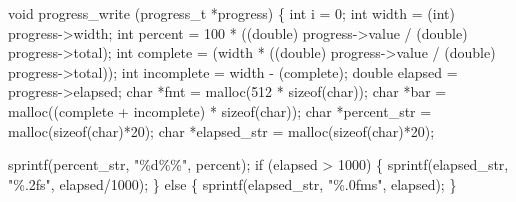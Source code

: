 \documentclass[
  a4paper,
]{scrreprt}
\newenvironment{Shaded}{\begin{snugshade}}{\end{snugshade}}
\newcommand{\ControlFlowTok}[1]{\textcolor[rgb]{0.85,0.12,0.09}{#1}}
\newcommand{\DataTypeTok}[1]{\textcolor[rgb]{0.47,0.16,0.63}{#1}}
\newcommand{\DecValTok}[1]{\textcolor[rgb]{0.47,0.16,0.63}{#1}}
\newcommand{\KeywordTok}[1]{\textcolor[rgb]{0.85,0.12,0.09}{#1}}
\newcommand{\NormalTok}[1]{\textcolor[rgb]{0.33,0.33,0.33}{#1}}
\newcommand{\OperatorTok}[1]{\textcolor[rgb]{0.00,0.46,0.62}{#1}}
\newcommand{\SpecialCharTok}[1]{\textcolor[rgb]{0.00,0.46,0.62}{#1}}
\newcommand{\StringTok}[1]{\textcolor[rgb]{0.00,0.50,0.00}{#1}}
\theoremstyle{definition}
\theoremstyle{remark}
\begin{document}
\begin{Shaded}
\begin{Highlighting}[numbers=left,,]
\DataTypeTok{void}
\NormalTok{progress\_write }\OperatorTok{(}\NormalTok{progress\_t }\OperatorTok{*}\NormalTok{progress}\OperatorTok{)} \OperatorTok{\{}
  \DataTypeTok{int}\NormalTok{ i }\OperatorTok{=} \DecValTok{0}\OperatorTok{;}
  \DataTypeTok{int}\NormalTok{ width }\OperatorTok{=} \OperatorTok{(}\DataTypeTok{int}\OperatorTok{)}\NormalTok{ progress}\OperatorTok{{-}\textgreater{}}\NormalTok{width}\OperatorTok{;}
  \DataTypeTok{int}\NormalTok{ percent }\OperatorTok{=} \DecValTok{100} \OperatorTok{*} \OperatorTok{((}\DataTypeTok{double}\OperatorTok{)}\NormalTok{ progress}\OperatorTok{{-}\textgreater{}}\NormalTok{value }\OperatorTok{/} \OperatorTok{(}\DataTypeTok{double}\OperatorTok{)}\NormalTok{ progress}\OperatorTok{{-}\textgreater{}}\NormalTok{total}\OperatorTok{);}
  \DataTypeTok{int}\NormalTok{ complete }\OperatorTok{=} \OperatorTok{(}\NormalTok{width }\OperatorTok{*} \OperatorTok{((}\DataTypeTok{double}\OperatorTok{)}\NormalTok{ progress}\OperatorTok{{-}\textgreater{}}\NormalTok{value }\OperatorTok{/} \OperatorTok{(}\DataTypeTok{double}\OperatorTok{)}\NormalTok{ progress}\OperatorTok{{-}\textgreater{}}\NormalTok{total}\OperatorTok{));}
  \DataTypeTok{int}\NormalTok{ incomplete }\OperatorTok{=}\NormalTok{ width }\OperatorTok{{-}} \OperatorTok{(}\NormalTok{complete}\OperatorTok{);}
  \DataTypeTok{double}\NormalTok{ elapsed }\OperatorTok{=}\NormalTok{ progress}\OperatorTok{{-}\textgreater{}}\NormalTok{elapsed}\OperatorTok{;}
  \DataTypeTok{char} \OperatorTok{*}\NormalTok{fmt }\OperatorTok{=}\NormalTok{ malloc}\OperatorTok{(}\DecValTok{512} \OperatorTok{*} \KeywordTok{sizeof}\OperatorTok{(}\DataTypeTok{char}\OperatorTok{));}
  \DataTypeTok{char} \OperatorTok{*}\NormalTok{bar }\OperatorTok{=}\NormalTok{ malloc}\OperatorTok{((}\NormalTok{complete }\OperatorTok{+}\NormalTok{ incomplete}\OperatorTok{)} \OperatorTok{*} \KeywordTok{sizeof}\OperatorTok{(}\DataTypeTok{char}\OperatorTok{));}
  \DataTypeTok{char} \OperatorTok{*}\NormalTok{percent\_str }\OperatorTok{=}\NormalTok{ malloc}\OperatorTok{(}\KeywordTok{sizeof}\OperatorTok{(}\DataTypeTok{char}\OperatorTok{)*}\DecValTok{20}\OperatorTok{);}
  \DataTypeTok{char} \OperatorTok{*}\NormalTok{elapsed\_str }\OperatorTok{=}\NormalTok{ malloc}\OperatorTok{(}\KeywordTok{sizeof}\OperatorTok{(}\DataTypeTok{char}\OperatorTok{)*}\DecValTok{20}\OperatorTok{);}

\NormalTok{  sprintf}\OperatorTok{(}\NormalTok{percent\_str}\OperatorTok{,} \StringTok{"}\SpecialCharTok{\%d\%\%}\StringTok{"}\OperatorTok{,}\NormalTok{ percent}\OperatorTok{);}
  \ControlFlowTok{if} \OperatorTok{(}\NormalTok{elapsed }\OperatorTok{\textgreater{}} \DecValTok{1000}\OperatorTok{)} \OperatorTok{\{}
\NormalTok{    sprintf}\OperatorTok{(}\NormalTok{elapsed\_str}\OperatorTok{,} \StringTok{"}\SpecialCharTok{\%.2f}\StringTok{s"}\OperatorTok{,}\NormalTok{ elapsed}\OperatorTok{/}\DecValTok{1000}\OperatorTok{);}
  \OperatorTok{\}} \ControlFlowTok{else} \OperatorTok{\{}
\NormalTok{    sprintf}\OperatorTok{(}\NormalTok{elapsed\_str}\OperatorTok{,} \StringTok{"}\SpecialCharTok{\%.0f}\StringTok{ms"}\OperatorTok{,}\NormalTok{ elapsed}\OperatorTok{);}
  \OperatorTok{\}}
  


\end{Highlighting}
\end{Shaded}
\end{document}
